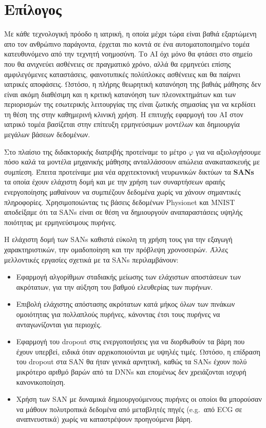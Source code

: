 \chapter{Επίλογος}
\label{chapter7}
Με κάθε τεχνολογική πρόοδο η ιατρική, η οποία μέχρι τώρα είναι βαθιά εξαρτώμενη απο τον ανθρώπινο παράγοντα, έρχεται πιο κοντά σε ένα αυτοματοποιημένο τομέα κατευθυνόμενο από την τεχνητή νοημοσύνη.
Το AI όχι μόνο θα φτάσει στο σημείο που θα ανιχνεύει ασθένειες σε πραγματικό χρόνο, αλλά θα ερμηνεύει επίσης αμφιλεγόμενες καταστάσεις, φαινοτυπικές πολύπλοκες ασθένειες και θα παίρνει ιατρικές αποφάσεις.
Ωστόσο, η πλήρης θεωρητική κατανόηση της βαθιάς μάθησης δεν είναι ακόμη διαθέσιμη και η κριτική κατανόηση των πλεονεκτημάτων και των περιορισμών της εσωτερικής λειτουργίας της είναι ζωτικής σημασίας για να κερδίσει τη θέση της στην καθημερινή κλινική χρήση.
Η επιτυχής εφαρμογή του AI στον ιατρικό τομέα βασίζεται στην επίτευξη ερμηνεύσιμων μοντέλων και δημιουργία μεγάλων βάσεων δεδομένων.

Στο πλαίσιο της διδακτορικής διατριβής προτείναμε το μέτρο $\varphi$ για να αξιολογήσουμε πόσο καλά τα μοντέλα μηχανικής μάθησης ανταλλάσσουν απώλεια ανακατασκευής με συμπίεση.
Έπειτα προτείναμε μια νέα αρχιτεκτονική νευρωνικών δικτύων τα \textbf{SANs} τα οποία έχουν ελάχιστη δομή και με την χρήση των συναρτήσεων αραιής ενεργοποίησης μαθαίνουν να συμπιέζουν δεδομένα χωρίς να χάνουν σημαντικές πληροφορίες.
Χρησιμοποιώντας τις βάσεις δεδομένων Physionet και MNIST αποδείξαμε ότι τα SANs είναι σε θέση να δημιουργούν αναπαραστάσεις υψηλής ποιότητας με ερμηνεύσιμους πυρήνες.

Η ελάχιστη δομή των SANs καθιστά εύκολη τη χρήση τους για την εξαγωγή χαρακτηριστικών, την ομαδοποίηση και την πρόβλεψη χρονοσειρών.
Άλλες μελλοντικές εργασίες σχετικά με τα SANs περιλαμβάνουν:
\begin{itemize}
	\item Εφαρμογή αλγορίθμων σταδιακής μείωσης των ελάχιστων αποστάσεων των ακρότατων, για την αύξηση του βαθμού ελευθερίας των πυρήνων.
	\item Επιβολή ελάχιστης απόστασης ακρότατων κατά μήκος όλων των πινάκων ομοιότητας για πολλαπλούς πυρήνες, κάνοντας έτσι τους πυρήνες να ανταγωνίζονται για περιοχές.
	\item Εφαρμογή του dropout στις ενεργοποιήσεις για να διορθωθούν τα βάρη που έχουν υπερβεί, ειδικά όταν αρχικοποιούνται με υψηλές τιμές.
		Ωστόσο, η επίδραση του dropout στα SAN θα ήταν γενικά αρνητική, καθώς τα SANs έχουν πολύ μικρότερο αριθμό βαρών από τα DNNs και επομένως δεν χρειάζονται ισχυρή κανονικοποίηση.
	\item Χρήση των SAN με δυναμικά δημιουργούμενους πυρήνες οι οποίοι θα μπορούσαν να μάθουν πολυτροπικά δεδομένα από μεταβλητές πηγές (e.g.\ από ECG σε αναπνευστικά) χωρίς να καταστρέψουν προηγούμενα βάρη.
\end{itemize}
